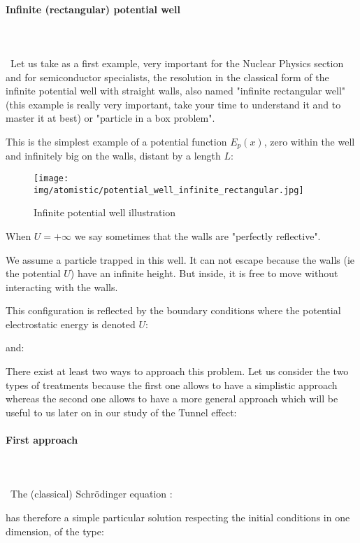 	\pagebreak
	\paragraph{Infinite (rectangular) potential well}\mbox{}\\\\\
	Let us take as a first example, very important for the Nuclear Physics section and for semiconductor specialists, the resolution in the classical form of the infinite potential well with straight walls, also named "infinite rectangular well" (this example is really very important, take your time to understand it and to master it at best) or "particle in a box problem".

	This is the simplest example of a potential function $E_p(x)$, zero within the well and infinitely big on the walls, distant by a length $L$:
	\begin{figure}[H]
		\centering
		\texttt{[image: img/atomistic/potential\_well\_infinite\_rectangular.jpg]}	
		\caption{Infinite potential well illustration}
	\end{figure} 
	\begin{tcolorbox}[title=Remark,colframe=black,arc=10pt]
	When $U=+\infty$ we say sometimes that the walls are "perfectly reflective".
	\end{tcolorbox}
	We assume a particle trapped in this well. It can not escape because the walls (ie the potential $U$) have an infinite height. But inside, it is free to move without interacting with the walls.

	This configuration is reflected by the boundary conditions where the potential electrostatic energy is denoted $U$:
	
	and:
	
	There exist at least two ways to approach this problem. Let us consider the two types of treatments because the first one allows to have a simplistic approach whereas the second one allows to have a more general approach which will be useful to us later on in our study of the Tunnel effect:
	
	\paragraph{First approach}\mbox{}\\\\\
	The (classical) Schrödinger equation :
	
	has therefore a simple particular solution respecting the initial conditions in one dimension, of the type:
	
